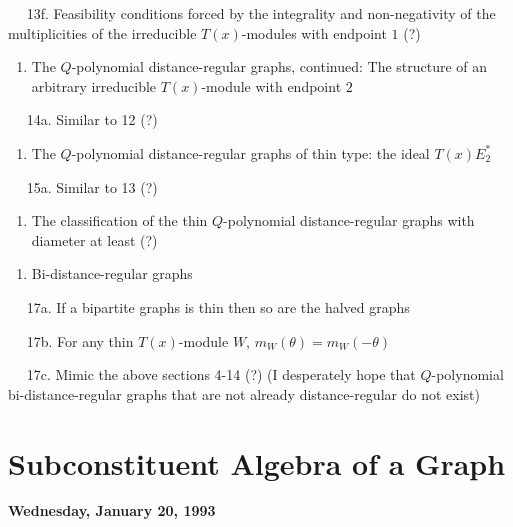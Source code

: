 \documentclass[
]{book}
\providecommand{\tightlist}{%
  \setlength{\itemsep}{0pt}\setlength{\parskip}{0pt}}
\theoremstyle{definition}
\theoremstyle{definition}
\theoremstyle{definition}
\theoremstyle{definition}
\theoremstyle{remark}
\begin{document}
\(\quad\) 13f. Feasibility conditions forced by the integrality and non-negativity of the multiplicities of the irreducible \(T(x)\)-modules with endpoint \(1\) (?)

\begin{enumerate}
\def\labelenumi{\arabic{enumi}.}
\setcounter{enumi}{13}
\tightlist
\item
  The \(Q\)-polynomial distance-regular graphs, continued: The structure of an arbitrary irreducible \(T(x)\)-module with endpoint \(2\)
\end{enumerate}

\(\quad\) 14a. Similar to 12 (?)

\begin{enumerate}
\def\labelenumi{\arabic{enumi}.}
\setcounter{enumi}{14}
\tightlist
\item
  The \(Q\)-polynomial distance-regular graphs of thin type: the ideal \(T(x)E^*_2\)
\end{enumerate}

\(\quad\) 15a. Similar to 13 (?)

\begin{enumerate}
\def\labelenumi{\arabic{enumi}.}
\setcounter{enumi}{15}
\tightlist
\item
  The classification of the thin \(Q\)-polynomial distance-regular graphs with diameter at least (?)
\end{enumerate}

\begin{enumerate}
\def\labelenumi{\arabic{enumi}.}
\setcounter{enumi}{16}
\tightlist
\item
  Bi-distance-regular graphs
\end{enumerate}

\(\quad\) 17a. If a bipartite graphs is thin then so are the halved graphs

\(\quad\) 17b. For any thin \(T(x)\)-module \(W\), \(m_W(\theta) = m_W(-\theta)\)

\(\quad\) 17c. Mimic the above sections 4-14 (?) (I desperately hope that \(Q\)-polynomial bi-distance-regular graphs that are not already distance-regular do not exist)

\hfill\break

\hypertarget{lec1}{%
\chapter{Subconstituent Algebra of a Graph}\label{lec1}}

\textbf{Wednesday, January 20, 1993}
\end{document}
